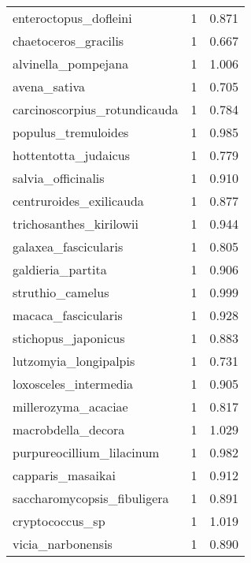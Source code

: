 \begin{tabular}{lrr}
          enteroctopus\_dofleini &                   1 &     0.871 \\
           chaetoceros\_gracilis &                   1 &     0.667 \\
            alvinella\_pompejana &                   1 &     1.006 \\
                   avena\_sativa &                   1 &     0.705 \\
   carcinoscorpius\_rotundicauda &                   1 &     0.784 \\
            populus\_tremuloides &                   1 &     0.985 \\
           hottentotta\_judaicus &                   1 &     0.779 \\
             salvia\_officinalis &                   1 &     0.910 \\
        centruroides\_exilicauda &                   1 &     0.877 \\
        trichosanthes\_kirilowii &                   1 &     0.944 \\
           galaxea\_fascicularis &                   1 &     0.805 \\
              galdieria\_partita &                   1 &     0.906 \\
               struthio\_camelus &                   1 &     0.999 \\
            macaca\_fascicularis &                   1 &     0.928 \\
            stichopus\_japonicus &                   1 &     0.883 \\
          lutzomyia\_longipalpis &                   1 &     0.731 \\
          loxosceles\_intermedia &                   1 &     0.905 \\
            millerozyma\_acaciae &                   1 &     0.817 \\
             macrobdella\_decora &                   1 &     1.029 \\
      purpureocillium\_lilacinum &                   1 &     0.982 \\
              capparis\_masaikai &                   1 &     0.912 \\
    saccharomycopsis\_fibuligera &                   1 &     0.891 \\
                cryptococcus\_sp &                   1 &     1.019 \\
              vicia\_narbonensis &                   1 &     0.890 \\

\end{tabular}
